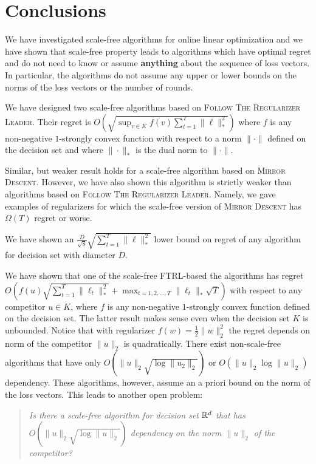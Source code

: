 \section{Conclusions}
\label{section:conclusions}

We have investigated scale-free algorithms for online linear optimization and
we have shown that scale-free property leads to algorithms which have optimal
regret and do not need to know or assume \textbf{anything} about the sequence
of loss vectors. In particular, the algorithms do not assume any upper or lower
bounds on the norms of the loss vectors or the number of rounds.

We have designed two scale-free algorithms based on \textsc{Follow The
Regularizer Leader}.  Their regret is $O \left(\sqrt{\sup_{v \in K} f(v)
\sum_{t=1}^T \|\ell\|_*^2} \right)$ where $f$ is any non-negative $1$-strongly
convex function with respect to a norm $\|\cdot\|$ defined on the decision set
and where $\|\cdot\|_*$ is the dual norm to $\|\cdot\|$.

Similar, but weaker result holds for a scale-free algorithm based on
\textsc{Mirror Descent}. However, we have also shown this algorithm is strictly
weaker than algorithms based on \textsc{Follow The Regularizer Leader}. Namely,
we gave examples of regularizers for which the scale-free version of
\textsc{Mirror Descent} has $\Omega(T)$ regret or worse.

We have shown an $\frac{D}{\sqrt{8}} \sqrt{\sum_{t=1}^T \|\ell\|_*^2}$
lower bound on regret of any algorithm for decision set with diameter $D$.

We have shown that one of the scale-free \textsc{FTRL}-based the algorithms has
regret $O \left(f(u) \sqrt{\sum_{t=1}^T \|\ell_t\|_*^2} + \max_{t=1,2,\dots,T}
\|\ell_t\|_* \sqrt{T} \right)$ with respect to any competitor $u \in K$, where
$f$ is any non-negative $1$-strongly convex function defined on the decision
set.  The latter result makes sense even when the decision set $K$ is
unbounded. Notice that with regularizer $f(w) = \frac{1}{2}\|w\|_2^2$ the
regret depends on norm of the competitor $\|u\|_2$ is quadratically. There
exist non-scale-free algorithms \cite{ McMahan-Streeter-2012,
McMahan-Abernethy-2013, Orabona-2013, McMahan-Orabona-2014, Orabona-2014} that
have only $O(\|u\|_2 \sqrt{\log \|u_2\|_2})$ or $O(\|u\|_2 \log \|u\|_2)$
dependency.  These algorithms, however, assume an a priori bound on the norm of
the loss vectors.  This leads to another open problem:
%
\begin{quotation}
\noindent
\emph{Is there a scale-free algorithm
for decision set $\mathbb{R}^d$ that has $O(\|u\|_2 \sqrt{\log \|u\|_2})$
dependency on the norm $\|u\|_2$ of the competitor?}
\end{quotation}
